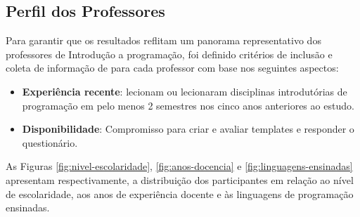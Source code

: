 \subsection{Perfil dos Professores}
Para garantir que os resultados reflitam um panorama representativo dos professores de Introdução a programação, foi definido critérios de inclusão e coleta de informação de para cada professor com base nos seguintes aspectos: 

\begin{itemize}
    \item \textbf{Experiência recente}: lecionam ou lecionaram disciplinas introdutórias de programação em pelo menos 2 semestres nos cinco anos anteriores ao estudo.
    \item \textbf{Disponibilidade}: Compromisso para criar e avaliar templates e responder o questionário.
\end{itemize}

As Figuras \ref{fig:nivel-escolaridade}, \ref{fig:anos-docencia} e \ref{fig:linguagens-ensinadas} apresentam respectivamente, a distribuição dos participantes em relação ao nível de escolaridade, aos anos de experiência docente e às linguagens de programação ensinadas.

